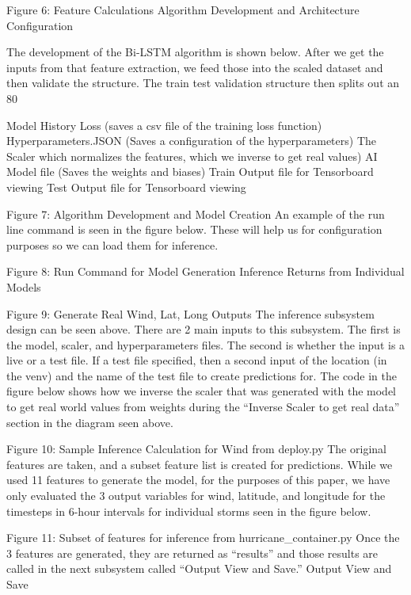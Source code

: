 \documentclass{article}
\begin{document}
Figure 6: Feature Calculations
Algorithm Development and Architecture Configuration

The development of the Bi-LSTM algorithm is shown below. After we get the inputs from that feature extraction, we feed those into the scaled dataset and then validate the structure. The train test validation structure then splits out an 80%

Model History Loss (saves a csv file of the training loss function)
Hyperparameters.JSON (Saves a configuration of the hyperparameters)
The Scaler which normalizes the features, which we inverse to get real values)
AI Model file (Saves the weights and biases)
Train Output file for Tensorboard viewing
Test Output file for Tensorboard viewing


Figure 7: Algorithm Development and Model Creation
An example of the run line command is seen in the figure below. These will help us for configuration purposes so we can load them for inference.


Figure 8: Run Command for Model Generation
Inference Returns from Individual Models

Figure 9: Generate Real Wind, Lat, Long Outputs
The inference subsystem design can be seen above. There are 2 main inputs to this subsystem. The first is the model, scaler, and hyperparameters files. The second is whether the input is a live or a test file. If a test file specified, then a second input of the location (in the venv) and the name of the test file to create predictions for. The code in the figure below shows how we inverse the scaler that was generated with the model to get real world values from weights during the “Inverse Scaler to get real data” section in the diagram seen above.


Figure 10: Sample Inference Calculation for Wind from deploy.py
The original features are taken, and a subset feature list is created for predictions. While we used 11 features to generate the model, for the purposes of this paper, we have only evaluated the 3 output variables for wind, latitude, and longitude for the timesteps in 6-hour intervals for individual storms seen in the figure below.


Figure 11: Subset of features for inference from hurricane_container.py
Once the 3 features are generated, they are returned as “results” and those results are called in the next subsystem called “Output View and Save.”
Output View and Save 
\end{document}

